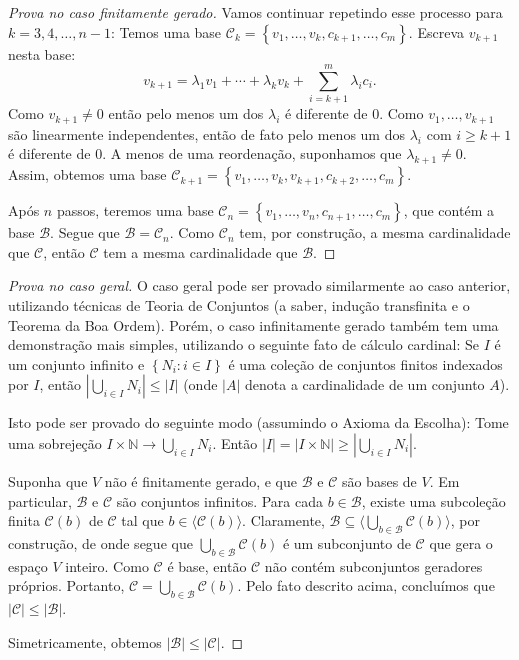 \begin{proof}[Prova no caso finitamente gerado]
Vamos continuar repetindo esse processo para $k=3,4,\ldots,n-1$: Temos uma base $\mathcal{C}_k=\left\{v_1,\ldots,v_k,c_{k+1},\ldots,c_m\right\}$. Escreva $v_{k+1}$ nesta base:
\[v_{k+1}=\lambda_1v_1+\cdots+\lambda_k v_k+\sum_{i=k+1}^m\lambda_i c_i.\]
Como $v_{k+1}\neq 0$ então pelo menos um dos $\lambda_i$ é diferente de $0$. Como $v_1,\ldots,v_{k+1}$ são linearmente independentes, então de fato pelo menos um dos $\lambda_i$ com $i\geq k+1$ é diferente de $0$. A menos de uma reordenação, suponhamos que $\lambda_{k+1}\neq 0$. Assim, obtemos uma base $\mathcal{C}_{k+1}=\left\{v_1,\ldots,v_k,v_{k+1},c_{k+2},\ldots,c_m\right\}$.

Após $n$ passos, teremos uma base $\mathcal{C}_n=\left\{v_1,\ldots,v_n,c_{n+1},\ldots,c_m\right\}$, que contém a base $\mathcal{B}$. Segue que $\mathcal{B}=\mathcal{C}_n$. Como $\mathcal{C}_n$ tem, por construção, a mesma cardinalidade que $\mathcal{C}$, então $\mathcal{C}$ tem a mesma cardinalidade que $\mathcal{B}$.
\end{proof}

\begin{proof}[Prova no caso geral]
O caso geral pode ser provado similarmente ao caso anterior, utilizando técnicas de Teoria de Conjuntos (a saber, indução transfinita e o Teorema da Boa Ordem). Porém, o caso infinitamente gerado também tem uma demonstração mais simples, utilizando o seguinte fato de cálculo cardinal: Se $I$ é um conjunto infinito e $\left\{N_i:i\in I\right\}$ é uma coleção de conjuntos finitos indexados por $I$, então $\left|\bigcup_{i\in I}N_i\right|\leq|I|$ (onde $|A|$ denota a cardinalidade de um conjunto $A$).

Isto pode ser provado do seguinte modo (assumindo o Axioma da Escolha): Tome uma sobrejeção $I\times\mathbb{N}\to\bigcup_{i\in I}N_i$. Então $|I|=|I\times\mathbb{N}|\geq \left|\bigcup_{i\in I}N_i\right|$.

Suponha que $V$ não é finitamente gerado, e que $\mathcal{B}$ e $\mathcal{C}$ são bases de $V$. Em particular, $\mathcal{B}$ e $\mathcal{C}$ são conjuntos infinitos. Para cada $b\in\mathcal{B}$, existe uma subcoleção finita $\mathcal{C}(b)$ de $\mathcal{C}$ tal que $b\in\langle\mathcal{C}(b)\rangle$. Claramente, $\mathcal{B}\subseteq\langle\bigcup_{b\in\mathcal{B}}\mathcal{C}(b)\rangle$, por construção, de onde segue que $\bigcup_{b\in\mathcal{B}}\mathcal{C}(b)$ é um subconjunto de $\mathcal{C}$ que gera o espaço $V$ inteiro. Como $\mathcal{C}$ é base, então $\mathcal{C}$ não contém subconjuntos geradores próprios. Portanto, $\mathcal{C}=\bigcup_{b\in\mathcal{B}}\mathcal{C}(b)$. Pelo fato descrito acima, concluímos que $|\mathcal{C}|\leq|\mathcal{B}|$.

Simetricamente, obtemos $|\mathcal{B}|\leq|\mathcal{C}|$.
\end{proof}
